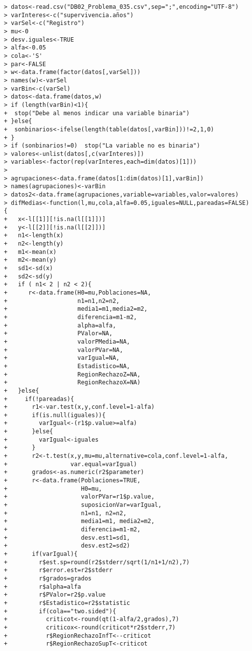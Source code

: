 \begin{solucion}
\begin{verbatim}
> datos<-read.csv("DB02_Problema_035.csv",sep=";",encoding="UTF-8")
> varInteres<-c("supervivencia.años")
> varSel<-c("Registro")
> mu<-0
> desv.iguales<-TRUE
> alfa<-0.05
> cola<-'S'
> par<-FALSE
> w<-data.frame(factor(datos[,varSel]))
> names(w)<-varSel
> varBin<-c(varSel)
> datos<-data.frame(datos,w)
> if (length(varBin)<1){
+  stop("Debe al menos indicar una variable binaria")
+ }else{
+  sonbinarios<-ifelse(length(table(datos[,varBin]))!=2,1,0)
+ }
> if (sonbinarios!=0)  stop("La variable no es binaria")
> valores<-unlist(datos[,c(varInteres)])
> variables<-factor(rep(varInteres,each=dim(datos)[1]))
> 
> agrupaciones<-data.frame(datos[1:dim(datos)[1],varBin])
> names(agrupaciones)<-varBin
> datos2<-data.frame(agrupaciones,variable=variables,valor=valores)
> difMedias<-function(l,mu,cola,alfa=0.05,iguales=NULL,pareadas=FALSE){
+   x<-l[[1]][!is.na(l[[1]])]
+   y<-l[[2]][!is.na(l[[2]])]
+   n1<-length(x)
+   n2<-length(y)
+   m1<-mean(x)
+   m2<-mean(y)
+   sd1<-sd(x)
+   sd2<-sd(y)
+   if ( n1< 2 | n2 < 2){
+      r<-data.frame(H0=mu,Poblaciones=NA,
+                    n1=n1,n2=n2,
+                    media1=m1,media2=m2,
+                    diferencia=m1-m2,
+                    alpha=alfa,
+                    PValor=NA,
+                    valorPMedia=NA,
+                    valorPVar=NA,
+                    varIgual=NA,
+                    Estadistico=NA,
+                    RegionRechazoZ=NA,
+                    RegionRechazoX=NA)
+   }else{
+     if(!pareadas){
+       r1<-var.test(x,y,conf.level=1-alfa)
+       if(is.null(iguales)){
+         varIgual<-(r1$p.value>=alfa)
+       }else{
+         varIgual<-iguales
+       }
+       r2<-t.test(x,y,mu=mu,alternative=cola,conf.level=1-alfa,
+                  var.equal=varIgual)
+       grados<-as.numeric(r2$parameter)
+       r<-data.frame(Poblaciones=TRUE,
+                     H0=mu,
+                     valorPVar=r1$p.value,
+                     suposicionVar=varIgual,
+                     n1=n1, n2=n2,
+                     media1=m1, media2=m2,
+                     diferencia=m1-m2,
+                     desv.est1=sd1,
+                     desv.est2=sd2)
+       if(varIgual){
+         r$est.sp=round(r2$stderr/sqrt(1/n1+1/n2),7)
+         r$error.est=r2$stderr
+         r$grados=grados
+         r$alpha=alfa
+         r$PValor=r2$p.value
+         r$Estadistico=r2$statistic
+         if(cola=="two.sided"){
+           criticot<-round(qt(1-alfa/2,grados),7)
+           criticox<-round(criticot*r2$stderr,7)
+           r$RegionRechazoInfT<--criticot
+           r$RegionRechazoSupT<-criticot

\end{verbatim}
\end{solucion}
